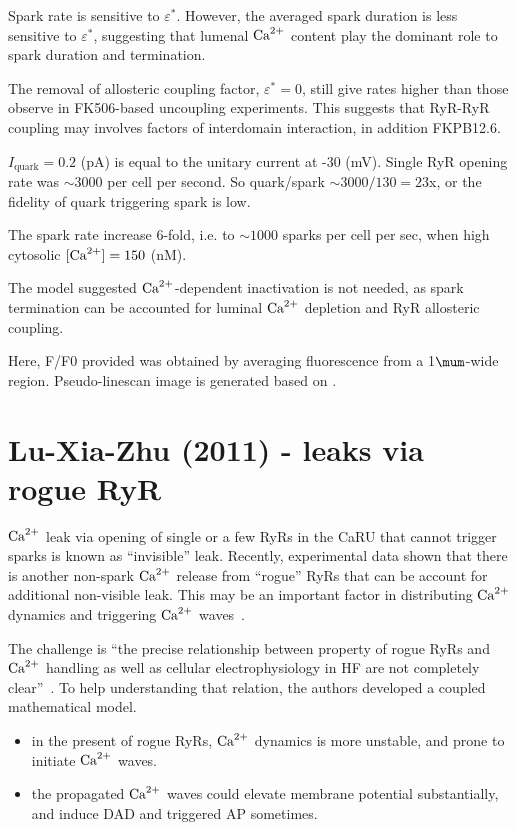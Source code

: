 Spark rate is sensitive to $\varepsilon^*$. However, the averaged spark duration
is less sensitive to $\varepsilon^*$, suggesting that lumenal ${\text{Ca}^{2+}}$ content play
the dominant role to spark duration and termination. 

The removal of allosteric coupling factor, $\varepsilon^*=0$, still give rates
higher than those observe in FK506-based uncoupling experiments. This suggests that RyR-RyR
coupling may involves factors of interdomain interaction, in addition FKPB12.6. 

$I_\text{quark}=0.2$ (pA) is equal to the unitary current at -30 (mV). Single
RyR opening rate was $\sim 3000$ per cell per second. So quark/spark
$\sim 3000/130 = 23$x, or the fidelity of quark triggering spark is low. 

The spark rate increase 6-fold, i.e. to $\sim 1000$ sparks per cell per sec,
when high cytosolic $[{\text{Ca}^{2+}}]=150$ (nM). 

The model suggested ${\text{Ca}^{2+}}$-dependent inactivation is not needed, as spark
termination can be accounted for luminal ${\text{Ca}^{2+}}$ depletion and RyR allosteric
coupling. 

Here, F/F0 provided was obtained by averaging fluorescence from a 1$\mum$-wide
region. Pseudo-linescan image is generated based on \citep{sobie2002tcas}. 

\section{Lu-Xia-Zhu (2011) - leaks via rogue RyR}
\label{sec:lu-xia-zhu}

${\text{Ca}^{2+}}$ leak via opening of single or a few RyRs in the CaRU that cannot
trigger sparks is known as ``invisible'' leak. Recently, experimental
data shown that there is another non-spark ${\text{Ca}^{2+}}$ release from
``rogue'' RyRs that can be account for additional non-visible
leak. This may be an important factor in distributing ${\text{Ca}^{2+}}$ dynamics
and triggering ${\text{Ca}^{2+}}$ waves~\citep{macquaide2010, lu2010}. 


The challenge is ``the precise relationship between property of rogue
RyRs and ${\text{Ca}^{2+}}$ handling as well as cellular electrophysiology in HF
are not completely clear''~\citep{}. To help understanding that
relation, the authors developed a coupled mathematical model. 
\begin{itemize}
\item in the present of rogue RyRs, ${\text{Ca}^{2+}}$ dynamics is more unstable,
  and prone to initiate ${\text{Ca}^{2+}}$ waves.
\item the propagated ${\text{Ca}^{2+}}$ waves could elevate membrane potential
  substantially, and induce DAD and triggered AP sometimes. 
\end{itemize}




